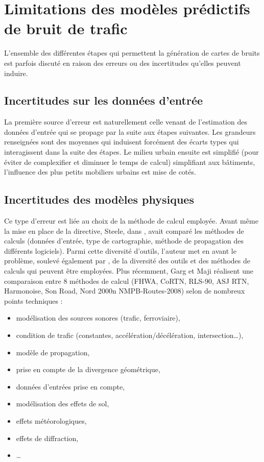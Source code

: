 \section{Limitations des modèles prédictifs de bruit de trafic}

L'ensemble des différentes étapes qui permettent la génération de cartes de bruits est parfois discuté en raison des erreurs ou des incertitudes qu'elles peuvent induire. 

\subsection{Incertitudes sur les données d'entrée}

La première source d'erreur est naturellement celle venant de l'estimation des données d'entrée qui se propage par la suite aux étapes suivantes. 
Les grandeurs renseignées sont des moyennes qui induisent forcément des écarts types qui interagissent dans la suite des étapes. Le milieu urbain ensuite est simplifié (pour éviter de complexifier et diminuer le temps de calcul) simplifiant aux bâtiments, l'influence des plus petits mobiliers urbains est mise de cotés.
 

\subsection{Incertitudes des modèles physiques}

Ce type d'erreur est liée au choix de la méthode de calcul employée. Avant même la mise en place de la directive, Steele, dans \cite{steele_critical_2001}, avait comparé les méthodes de calculs (données d'entrée, type de cartographie, méthode de propagation des différents logiciels). Parmi cette diversité d'outils, l'auteur met en avant le problème, soulevé également par \cite{king_implementation_2011}, de la diversité des outils et des méthodes de calculs qui peuvent être employées. Plus récemment, Garg et Maji \cite{garg_critical_2014} réalisent une comparaison entre 8 méthodes de calcul (FHWA, CoRTN, RLS-90, ASJ RTN, Harmonoise, Son Road, Nord 2000n NMPB-Routes-2008) selon de nombreux points techniques : 

\begin{itemize}
\item modélisation des sources sonores (trafic, ferroviaire), 
\item condition de trafic (constantes, accélération/décélération, intersection\dots), 
\item modèle de propagation, 
\item prise en compte de la divergence géométrique, 
\item données d'entrées prise en compte, 
\item modélisation des effets de sol,
\item effets météorologiques,
\item effets de diffraction,
\item \dots  \\
\end{itemize}


